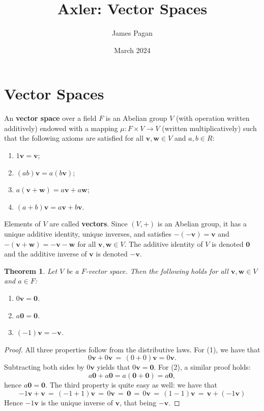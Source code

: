 \documentclass[11pt]{article}
\title{Axler: Vector Spaces}
\author{James Pagan}
\date{March 2024}
\newtheorem{theorem}{Theorem}
\renewcommand{\vec}[1]{\mathbf{#1}}
\begin{document}
\maketitle
\tableofcontents
\newpage


\section{Vector Spaces}


An \textbf{vector space} over a field $F$ is an Abelian group $V$ (with operation written additively) endowed with a mapping $\mu : F \times V \to V$ (written multiplicatively) such that the following axioms are satisfied for all $\vec{v}, \vec{w} \in V$ and $a, b \in R$:
\begin{enumerate}
	\item $1 \vec{v} = \vec{v}$;
	\item $(ab)\vec{v} = a(b \vec{v})$;
	\item $a(\vec{v} + \vec{w}) = a \vec{v} + a \vec{w}$;
	\item $(a + b) \vec{v} = a \vec{v} + b \vec{v}$.
\end{enumerate}

Elements of $V$ are called \textbf{vectors}. Since $(V, +)$ is an Abelian group, it has a unique additive identity, unique inverses, and satisfies $-(- \vec{v}) = \vec{v}$ and $- (\vec{v} + \vec{w}) = - \vec{v} - \vec{w}$ for all $\vec{v}, \vec{w} \in V$. The additive identity of $V$ is denoted $\vec{0}$ and the additive inverse of $\vec{v}$ is denoted $-\vec{v}$.

\begin{adjustwidth}{0.5cm}{}
  \begin{theorem}
    Let $V$ be a $F$-vector space. Then the following holds for all $\vec{v}, \vec{w} \in V$ and $a \in F$:
    \begin{enumerate}
      \item $0 \vec{v} = \vec{0}$.
      \item $a \vec{0} = \vec{0}$.
      \item $(-1) \vec{v} = - \vec{v}$.
    \end{enumerate}
  \end{theorem}
  \begin{proof}
    All three properties follow from the distributive laws. For (1), we have that
    \[
      0 \vec{v} + 0 \vec{v} \, = \, (0 + 0) \vec{v} = 0 \vec{v}.
    \]
    Subtracting both sides by $0 \vec{v}$ yields that $0 \vec{v} = \vec{0}$. For (2), a similar proof holds:
    \[
      a \vec{0} + a \vec{0} = a(\vec{0} + \vec{0}) = a \vec{0},
    \]
    hence $a \vec{0} = \vec{0}$. The third property is quite easy as well: we have that
    \[
      -1 \vec{v} + \vec{v} \, = \, (-1 + 1) \vec{v} \, = \, 0 \vec{v} \, = \, \vec{0} \, = \, 0 \vec{v} \, = \, (1 - 1) \vec{v} \, = \, \vec{v} + (-1 \vec{v})
    \]
    Hence $-1 \vec{v}$ is the unique inverse of $\vec{v}$, that being $-\vec{v}$.
  \end{proof}
\end{adjustwidth}
\end{document}
